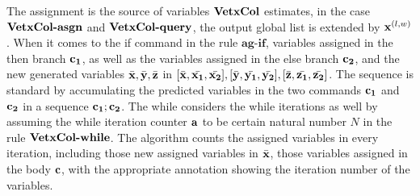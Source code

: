 \documentclass[a4paper,11pt]{article}
\begin{document}
%
The assignment is the source of variables $\bf{VetxCol}$ estimates, 
	in the case $\textbf{\bf{VetxCol}-asgn}$ and $\textbf{\bf{VetxCol}-query}$, 
	the output global list is extended by $\mathbf{{x}}^{(l,w)}$. 
	When it comes to the if command in the rule $\textbf{ag-if}$, variables assigned in the then branch $\mathbf{{c_1}}$, as well as the variables assigned in the else branch $\mathbf{{c_2}}$, and the new generated variables $\bar{\mathbf{{x}}},\bar{\mathbf{{y}}},\bar{\mathbf{{z}}}$ in $ [ \bar{\mathbf{{x}}}, \bar{\mathbf{{x_1}}}, \bar{\mathbf{{x_2}}}] ,[ \bar{\mathbf{{y}}}, \bar{\mathbf{{y_1}}}, \bar{\mathbf{{y_2}}}],[ \bar{\mathbf{{z}}}, \bar{\mathbf{{z_1}}}, \bar{\mathbf{{z_2}}}]$. 
	The sequence is standard by accumulating the predicted variables in the two commands $\mathbf{{c_1}}$ and $\mathbf{{c_2}}$ in a sequence $\mathbf{{c_1;c_2}}$. 
	The while considers the while iterations as well by assuming the while iteration counter $\mathbf{{a}}$ to be certain natural number $N$ in the rule $\textbf{\bf{VetxCol}-while}$. 
	The algorithm counts the assigned variables in every iteration, including those new assigned variables in $\bar{\mathbf{{x}}}$, those variables assigned in the body $\mathbf{{c}}$, with the appropriate annotation showing the iteration number of the variables.     
%
\end{document}
